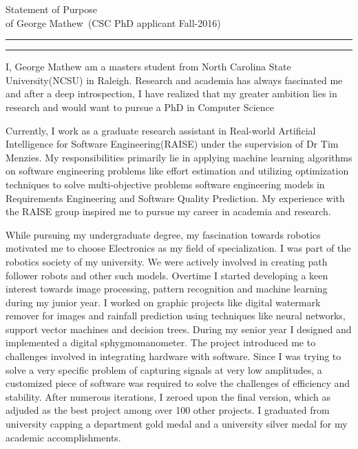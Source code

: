 \documentclass{article}
\newcommand{\soptitle}{Statement of Purpose}
\newcommand{\yourname}{George Mathew}
\begin{document}
\begin{center}\LARGE\soptitle\\
\large of \yourname\ (CSC PhD applicant Fall-2016)
\end{center}

\hrule
\vspace{1pt}
\hrule height 1pt

\bigskip

I, George Mathew am a masters student from North Carolina State University(NCSU) in Raleigh. Research and academia has always fascinated me and after a deep introspection, I have realized that my greater ambition lies in research and would want to pursue a PhD in Computer Science

\bigskip
Currently, I work as a graduate research assistant in Real-world Artificial Intelligence for 
Software Engineering(RAISE) under the supervision of Dr Tim Menzies.
 My responsibilities primarily lie in applying machine learning algorithms on software engineering 
 problems like effort estimation and utilizing optimization techniques to solve multi-objective problems software engineering models in Requirements Engineering and Software Quality Prediction. My experience with the RAISE group inspired me to pursue my career in academia and research. 

\bigskip

While pursuing my undergraduate degree, my fascination towards robotics motivated me to choose Electronics as my field of specialization. I was part of the robotics society of my university. We were actively involved in creating path follower robots and other such models. Overtime I started developing a keen interest towards image 
processing, pattern recognition and machine learning during my junior year. I worked on 
graphic projects like digital watermark remover for images and rainfall prediction using techniques like neural 
networks, support vector machines and decision trees. During my senior year I designed and implemented a digital sphygmomanometer. The project introduced me to challenges involved in integrating hardware with software. Since I was trying to solve a very specific problem of capturing signals at very low amplitudes, a customized piece of software was required to solve the challenges of efficiency and stability. After numerous iterations, I zeroed upon the final version, which as adjuded as the best project among over 100 other projects. I graduated from university capping a department gold 
medal and a university silver medal for my academic accomplishments.
\end{document}
